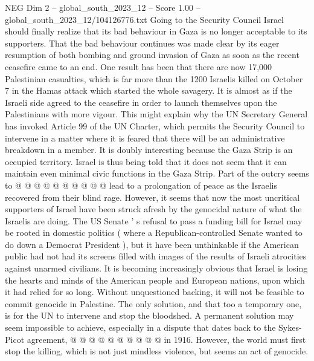 \begin{textsample}{NEG Dim 2 – global\_south\_2023\_12 – Score 1.00 – global\_south\_2023\_12/104126776.txt}  \label{ex:f2_neg_425}
Going to the Security Council Israel should finally realize that its bad behaviour in Gaza is no longer acceptable to its supporters.
That the bad behaviour continues was made clear by its eager resumption of both bombing and ground invasion of Gaza as soon as the recent ceasefire came to an end.
One result has been that there are now 17,000 Palestinian casualties, which is far more than the 1200 Israelis killed on October 7 in the Hamas attack which started the whole savagery.
It is almost as if the Israeli side agreed to the ceasefire in order to launch themselves upon the Palestinians with more vigour.
This might explain why the UN Secretary General has invoked Article 99 of the UN Charter, which permits the Security Council to intervene in a matter where it is feared that there will be an administrative breakdown in a member.
It is doubly interesting because the Gaza Strip is an occupied territory.
Israel is thus being told that it does not seem that it can maintain even minimal civic functions in the Gaza Strip.
Part of the outcry seems to @ @ @ @ @ @ @ @ @ @ lead to a prolongation of peace as the Israelis recovered from their blind rage.
However, it seems that now the most uncritical supporters of Israel have been struck afresh by the genocidal nature of what the Israelis are doing.
The US Senate ' s refusal to pass a funding bill for Israel may be rooted in domestic politics ( where a Republican-controlled Senate wanted to do down a Democrat President ), but it have been unthinkable if the American public had not had its screens filled with images of the results of Israeli atrocities against unarmed civilians.
It is becoming increasingly obvious that Israel is losing the hearts and minds of the American people and European nations, upon which it had relied for so long.
Without unquestioned backing, it will not be feasible to commit genocide in Palestine.
The only solution, and that too a temporary one, is for the UN to intervene and stop the bloodshed.
A permanent solution may seem impossible to achieve, especially in a dispute that dates back to the Sykes-Picot agreement, @ @ @ @ @ @ @ @ @ @ in 1916.
However, the world must first stop the killing, which is not just mindless violence, but seems an act of genocide.

\end{textsample}
